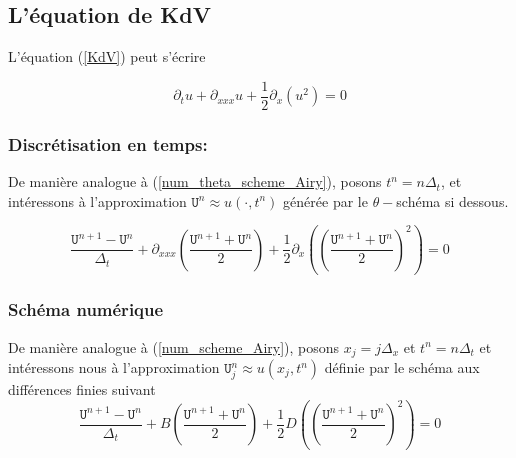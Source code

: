 \documentclass[12pt,a4paper]{article}
\numberwithin{equation}{section}
\begin{document}
\subsection{L'équation de KdV}
L'équation (\ref{KdV}) peut s'écrire

\begin{equation*}
    \partial_tu + \partial_{xxx}u +\frac{1}{2}\partial_x(u^2)  = 0
\end{equation*}

\subsubsection{ Discrétisation en temps: }

De manière analogue à (\ref{num_theta_scheme_Airy}), posons $t^n = n\Delta_t$, et intéressons à l'approximation $\texttt{U}^n \approx u(\cdot,t^n)$ générée par le $\theta-$schéma si dessous.

\begin{equation}
\frac{\texttt{U}^{n+1}-\texttt{U}^n}{\Delta_t} + \partial_{xxx}\left(\frac{\texttt{U}^{n+1} + \texttt{U}^{n}}{2}\right) + \frac{1}{2}\partial_{x}\left( \left(\frac{\texttt{U}^{n+1} + \texttt{U}^{n}}{2}\right)^2 \right) = 0 \label{num_theta_scheme_kdv}
\end{equation}
\subsubsection{Schéma numérique}



De manière analogue à (\ref{num_scheme_Airy}), posons $x_j = j\Delta_x$ et $t^n = n\Delta_t$  et intéressons nous à l'approximation $\texttt{U}^n_j \approx u(x_j,t^n)$ définie par le schéma aux différences finies suivant
\begin{equation}
\frac{\texttt{U}^{n+1}-\texttt{U}^n}{\Delta_t} + B\left(\frac{\texttt{U}^{n+1} + \texttt{U}^{n}}{2}\right) + \frac{1}{2}D\left( \left(\frac{\texttt{U}^{n+1} + \texttt{U}^{n}}{2}\right)^2 \right) = 0 \label{num_scheme_kdv}
\end{equation}
\end{document}
